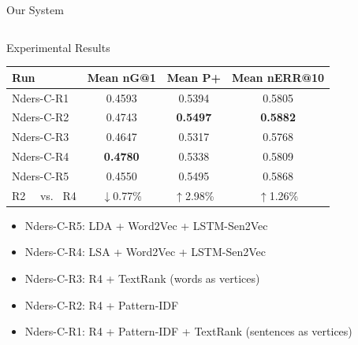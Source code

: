 \documentclass[final,hyperref={pdfpagelabels=false}]{beamer}
\begin{document}
\begin{frame}{}
\begin{block}{\large Our System}
    \end{block}
    \begin{columns}[t]
      \begin{column}{.49\linewidth}
        \begin{block}{Experimental Results}
          \begin{table}
          \centering
          \setlength\tabcolsep{1cm}
          \begin{tabular}{lccc}
          \hline
           Run        &  Mean nG@1  &  Mean P+  &  Mean nERR@10  \\ \hline
           Nders-C-R1 & 0.4593 & 0.5394 & 0.5805 \\ %
           Nders-C-R2 & 0.4743 & \textbf{0.5497} & \textbf{0.5882} \\ %
           Nders-C-R3 & 0.4647 & 0.5317 & 0.5768 \\ %
           Nders-C-R4 & \textbf{0.4780} & 0.5338 & 0.5809 \\ %
           Nders-C-R5 & 0.4550 & 0.5495 & 0.5868 \\ \hline
           R2 \ \ vs. \  R4  & $\downarrow$0.77\% & $\uparrow$2.98\% & $\uparrow$1.26\% \\ \hline

          \end{tabular}
          \end{table}
          \begin{itemize}
            \item{Nders-C-R5: } LDA + Word2Vec + LSTM-Sen2Vec 
            \item{Nders-C-R4: } LSA + Word2Vec + LSTM-Sen2Vec 
            \item{Nders-C-R3: } R4 + TextRank (words as vertices) 
            \item{Nders-C-R2: } R4 + Pattern-IDF
            \item{Nders-C-R1: } R4 + Pattern-IDF + TextRank (sentences as vertices)
          \end{itemize}
        \end{block}
      \end{column}
\end{columns}
\end{frame}
\end{document}
